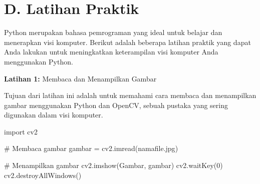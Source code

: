 \documentclass[
  letterpaper,
  DIV=11,
  numbers=noendperiod]{scrreprt}
\newenvironment{Shaded}{\begin{snugshade}}{\end{snugshade}}
\newcommand{\CommentTok}[1]{\textcolor[rgb]{0.37,0.37,0.37}{#1}}
\newcommand{\DecValTok}[1]{\textcolor[rgb]{0.68,0.00,0.00}{#1}}
\newcommand{\ImportTok}[1]{\textcolor[rgb]{0.00,0.46,0.62}{#1}}
\newcommand{\NormalTok}[1]{\textcolor[rgb]{0.00,0.23,0.31}{#1}}
\newcommand{\OperatorTok}[1]{\textcolor[rgb]{0.37,0.37,0.37}{#1}}
\newcommand{\StringTok}[1]{\textcolor[rgb]{0.13,0.47,0.30}{#1}}
\begin{document}
\hypertarget{d.-latihan-praktik}{%
\section*{D. Latihan Praktik}\label{d.-latihan-praktik}}


Python merupakan bahasa pemrograman yang ideal untuk belajar dan
menerapkan visi komputer. Berikut adalah beberapa latihan praktik yang
dapat Anda lakukan untuk meningkatkan keterampilan visi komputer Anda
menggunakan Python.

\textbf{Latihan 1:} Membaca dan Menampilkan Gambar

Tujuan dari latihan ini adalah untuk memahami cara membaca dan
menampilkan gambar menggunakan Python dan OpenCV, sebuah pustaka yang
sering digunakan dalam visi komputer.

\begin{Shaded}
\begin{Highlighting}[]
\ImportTok{import}\NormalTok{ cv2}

\CommentTok{\# Membaca gambar}
\NormalTok{gambar }\OperatorTok{=}\NormalTok{ cv2.imread(}\StringTok{\textquotesingle{}namafile.jpg\textquotesingle{}}\NormalTok{)}

\CommentTok{\# Menampilkan gambar}
\NormalTok{cv2.imshow(}\StringTok{\textquotesingle{}Gambar\textquotesingle{}}\NormalTok{, gambar)}
\NormalTok{cv2.waitKey(}\DecValTok{0}\NormalTok{)}
\NormalTok{cv2.destroyAllWindows()}
\end{Highlighting}
\end{Shaded}
\end{document}
